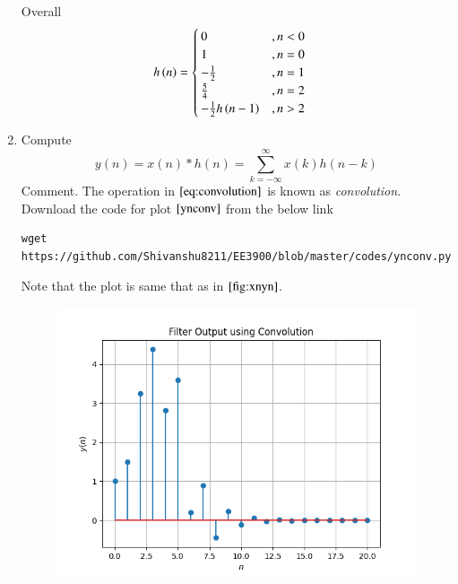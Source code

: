 \documentclass[journal,12pt,twocolumn]{IEEEtran}
\renewcommand\thesection{\arabic{section}}
\begin{document}
\begin{enumerate}[label=\thesection.\arabic*]
\begin{align}
           \end{align}
           Overall
           \begin{align}
                h\left(n\right) & = \begin{cases}
                                   0                       & , n <0  \\
                                   1                       & , n = 0 \\
                                   -\frac{1}{2}            & , n=1   \\
                                   \frac{5}{4}             & , n =2  \\
                                   -\frac{1}{2}h\left(n-1\right) & , n >2
                              \end{cases}
           \end{align}
     \item Compute
           \begin{equation}
                \label{eq:convolution}
                y(n) = x(n)*h(n) = \sum_{k=-\infty}^{\infty}x(k)h(n-k)
           \end{equation}
           Comment. The operation in $\eqref{eq:convolution}$ is known as
                {\em convolution}.\\
           \solution Download the code for plot $\ref{ynconv}$ from the below link
           \begin{lstlisting}
wget https://github.com/Shivanshu8211/EE3900/blob/master/codes/ynconv.py
            \end{lstlisting}
           Note that the plot is same that as in $\ref{fig:xnyn}$.
           \begin{figure}[ht!]
                \centering
                \includegraphics[width = \columnwidth]{figs/ynconv.png}

\end{figure}
\end{enumerate}
\end{document}
